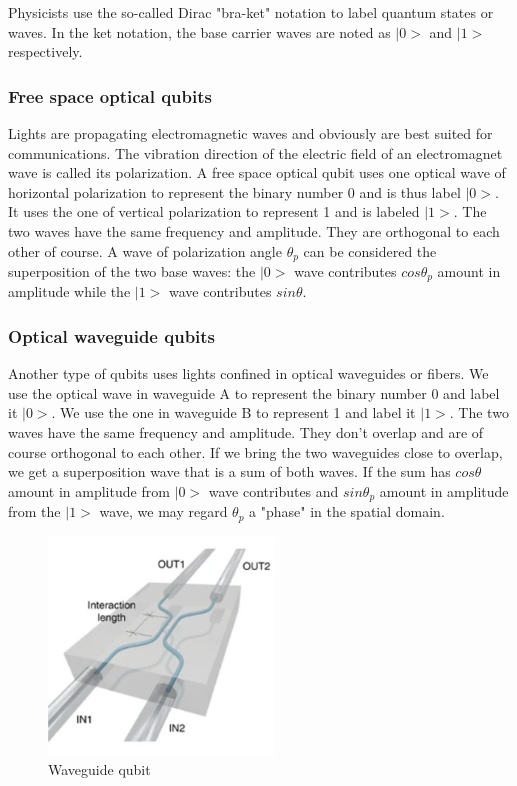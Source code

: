 \documentclass{book}
\begin{document}
Physicists use the so-called Dirac "bra-ket" notation to label quantum states or waves. In the ket notation, the base carrier waves are noted as $|0>$ and $|1>$ respectively.

\subsubsection{Free space optical qubits}
Lights are propagating electromagnetic waves and obviously are best suited for communications. The vibration direction of the electric field of an electromagnet wave is called its polarization. A free space optical qubit uses one optical wave of horizontal polarization to represent the binary number 0 and is thus label $|0>$. It uses the one of vertical polarization to represent 1 and is labeled $|1>$. The two waves have the same frequency and amplitude. They are orthogonal to each other of course. A wave of polarization angle $\theta_p$ can be considered the superposition of the two base waves: the $|0>$ wave contributes $cos\theta_p$ amount in amplitude while the $|1>$ wave contributes $sin\theta$.

\subsubsection{Optical waveguide qubits}
Another type of qubits uses lights confined in optical waveguides or fibers. We use the optical wave in waveguide A to represent the binary number 0 and label it $|0>$. We use the one in waveguide B to represent 1 and label it $|1>$. The two waves have the same frequency and amplitude. They don't overlap and are of course orthogonal to each other. If we bring the two waveguides close to overlap, we get a superposition wave that is a sum of both waves. If the sum has $cos\theta$ amount in amplitude from $|0>$ wave contributes and $sin\theta_p$ amount in amplitude from the $|1>$ wave, we may regard $\theta_p$ a "phase" in the spatial domain.

\begin{figure}[ht]
\includegraphics[width=6cm]{pic/wguideQubit.png}
\caption{Waveguide qubit}
\label{Waveguide}
\end{figure}
\end{document}
